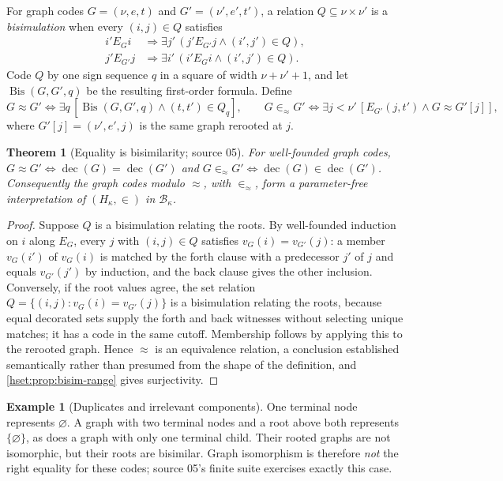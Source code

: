 \documentclass[11pt,letterpaper]{article}
\newtheorem{theorem}{Theorem}[section]
\theoremstyle{definition}
\newtheorem{example}[example]{Example}\aliascntresetthe{example}
\theoremstyle{remark}
\newcommand{\B}{\mathcal B}
\begin{document}
For graph codes $G=(\nu,e,t)$ and $G'=(\nu',e',t')$, a relation
$Q\subseteq\nu\times\nu'$ is a \emph{bisimulation} when every $(i,j)\in Q$
satisfies
\begin{align*}
 i'E_Gi&\Longrightarrow\exists j'\,(j'E_{G'}j\land(i',j')\in Q),\\
 j'E_{G'}j&\Longrightarrow\exists i'\,(i'E_Gi\land(i',j')\in Q).
\end{align*}
Code $Q$ by one sign sequence $q$ in a square of width $\nu+\nu'+1$, and let
$\operatorname{Bis}(G,G',q)$ be the resulting first-order formula. Define
\[
 G\approx G'\iff\exists q\,[\operatorname{Bis}(G,G',q)\land (t,t')\in Q_q],
 \qquad
 G\in_{\approx}G'\iff\exists j<\nu'\,[E_{G'}(j,t')\land G\approx G'[j]],
\]
where $G'[j]=(\nu',e',j)$ is the same graph rerooted at $j$.

\begin{theorem}[Equality is bisimilarity; source 05]\label{hset:thm:bisim}
For well-founded graph codes,
$G\approx G'\iff\operatorname{dec}(G)=\operatorname{dec}(G')$ and
$G\in_\approx G'\iff\operatorname{dec}(G)\in\operatorname{dec}(G')$.
Consequently the graph codes modulo $\approx$, with $\in_\approx$, form a
parameter-free interpretation of $(H_\kappa,\in)$ in $\B_\kappa$.
\end{theorem}
\begin{proof}
Suppose $Q$ is a bisimulation relating the roots. By well-founded induction on
$i$ along $E_G$, every $j$ with $(i,j)\in Q$ satisfies $v_G(i)=v_{G'}(j)$: a
member $v_G(i')$ of $v_G(i)$ is matched by the forth clause with a
predecessor $j'$ of $j$ and equals $v_{G'}(j')$ by induction, and the back
clause gives the other inclusion. Conversely, if the root values agree, the set
relation $Q=\{(i,j):v_G(i)=v_{G'}(j)\}$ is a bisimulation relating the roots,
because equal decorated sets supply the forth and back witnesses without
selecting unique matches; it has a code in the same cutoff. Membership
follows by applying this to the rerooted graph. Hence $\approx$ is an
equivalence relation, a conclusion established semantically rather than
presumed from the shape of the definition, and \cref{hset:prop:bisim-range}
gives surjectivity.
\end{proof}

\begin{example}[Duplicates and irrelevant components]
One terminal node represents $\varnothing$. A graph with two terminal nodes and
a root above both represents $\{\varnothing\}$, as does a graph with only one
terminal child. Their rooted graphs are not isomorphic, but their roots are
bisimilar. Graph isomorphism is therefore \emph{not} the right equality for
these codes; source 05's finite suite exercises exactly this case.
\end{example}
\end{document}
